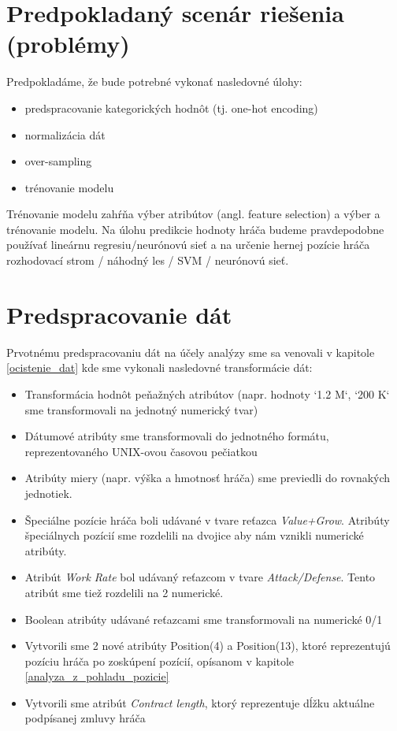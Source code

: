 \documentclass[runningheads]{llncs}
\begin{document}
\section{Predpokladaný scenár riešenia (problémy)}

Predpokladáme, že bude potrebné vykonať nasledovné úlohy:
\begin{itemize}
    \item predspracovanie kategorických hodnôt (tj. one-hot encoding)
    \item normalizácia dát
    \item over-sampling
    \item trénovanie modelu
\end{itemize}

Trénovanie modelu zahŕňa výber atribútov (angl. feature selection) a výber a trénovanie modelu. Na úlohu predikcie hodnoty hráča budeme pravdepodobne používať lineárnu regresiu/neurónovú sieť a na určenie hernej pozície hráča rozhodovací strom / náhodný les / SVM / neurónovú sieť.

\section{Predspracovanie dát}

Prvotnému predspracovaniu dát na účely analýzy sme sa venovali v kapitole \ref{ocistenie_dat} kde sme vykonali nasledovné transformácie dát:
\begin{itemize}
    \item Transformácia hodnôt peňažných atribútov (napr. hodnoty `1.2 M`, `200 K` sme transformovali na jednotný numerický tvar)
    \item Dátumové atribúty sme transformovali do jednotného formátu, reprezentovaného UNIX-ovou časovou pečiatkou
    \item Atribúty miery (napr. výška a hmotnosť hráča) sme previedli do rovnakých jednotiek.
    \item Špeciálne pozície hráča boli udávané v tvare reťazca \textit{Value+Grow}. Atribúty špeciálnych pozícií sme rozdelili na dvojice aby nám vznikli numerické atribúty.
    \item Atribút \textit{Work Rate} bol udávaný reťazcom v tvare \textit{Attack/Defense}. Tento atribút sme tiež rozdelili na 2 numerické.
    \item Boolean atribúty udávané reťazcami sme transformovali na numerické 0/1
    \item Vytvorili sme 2 nové atribúty Position(4) a Position(13), ktoré reprezentujú pozíciu hráča po zoskúpení pozícií, opísanom v kapitole \ref{analyza_z_pohladu_pozicie}
    \item Vytvorili sme atribút \textit{Contract length}, ktorý reprezentuje dĺžku aktuálne podpísanej zmluvy hráča 
\end{itemize}
\end{document}
